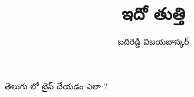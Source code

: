 \documentclass[12pt]{article}
\title{ఇదో తుత్తి}
\author{బదిరెడ్డి విజయబాస్కర్}
\begin{document}
\maketitle
తెలుగు లో టైప్ చేయడం ఎలా ?
\end{document}
